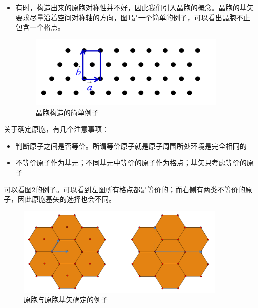 \documentclass{ctexart}
\begin{document}
\begin{itemize}
    \item 有时，构造出来的原胞对称性并不好，因此我们引入晶胞的概念。晶胞的基矢要求尽量沿着空间对称轴的方向，图\ref{fig:crystalCell}是一个简单的例子，可以看出晶胞不止包含一个格点。
    
        \begin{figure}[H]
        \centering
        \includegraphics[width=0.9\textwidth]{figure/crystal cell.png}
        \caption{晶胞构造的简单例子}
        \label{fig:crystalCell}
    \end{figure}
    \end{itemize}
    

    关于确定原胞，有几个注意事项：
    \begin{itemize}
        \item 判断原子之间是否等价。所谓等价原子就是原子周围所处环境是完全相同的
        \item 不等价原子作为基元；不同基元中等价的原子作为格点；基矢只考虑等价的原子
    \end{itemize}
    
    可以看图\ref{fig:example}的例子。可以看到左图所有格点都是等价的；而右侧有两类不等价的原子，因此原胞基矢的选择也会不同。
     \begin{figure}[H]
    \centering
    \includegraphics[width=0.9\textwidth]{figure/CH1_example.png}
    \caption{原胞与原胞基矢确定的例子}
    \label{fig:example}
    \end{figure}
    
\end{document}
